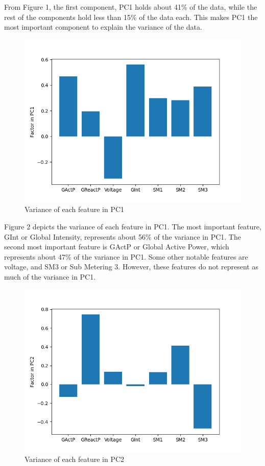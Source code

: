 \documentclass[11pt]{article}
\begin{document}
From Figure 1, the first component, PC1 holds about 41\% of the data, while 
the rest of the components hold less than 15\% of the data each.
This makes PC1 the most important component to explain the variance of the data.

\begin{figure}[H]
  \centering
  \includegraphics[scale=0.7, trim=0 0 15 20, clip]{../images/PC1_Factors.png}
  \caption{Variance of each feature in PC1}
\end{figure}

Figure 2 depicts the variance of each feature in PC1.
The most important feature, GInt or Global Intensity, represents about 56\% of 
the variance in PC1. 
The second most important feature is GActP or Global Active Power, which represents 
about 47\% of the variance in PC1.
Some other notable features are voltage, and SM3 or Sub Metering 3. 
However, these features do not represent as much of the variance in PC1.

\begin{figure}[H]
  \centering
  \includegraphics[scale=0.7, trim=0 0 15 20, clip]{../images/PC2_Factors.png}
  \caption{Variance of each feature in PC2}
\end{figure}
\end{document}
